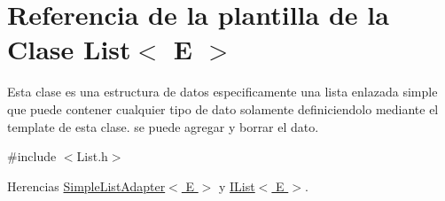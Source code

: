 \hypertarget{classList}{\section{Referencia de la plantilla de la Clase List$<$ E $>$}
\label{classList}
}


Esta clase es una estructura de datos especificamente una lista enlazada simple que puede contener cualquier tipo de dato solamente definiciendolo mediante el template de esta clase. se puede agregar y borrar el dato.  




{\ttfamily \#include $<$List.\-h$>$}



Herencias \hyperlink{classSimpleListAdapter}{Simple\-List\-Adapter$<$ E $>$} y \hyperlink{classIList}{I\-List$<$ E $>$}.


